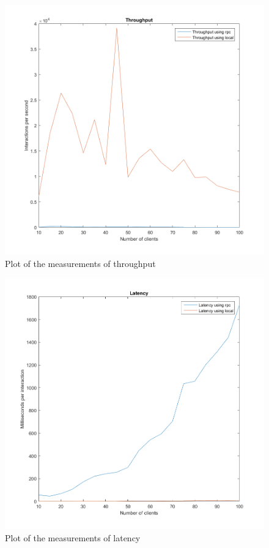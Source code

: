 \documentclass{article}
\theoremstyle{plain}
\theoremstyle{nonumberplain}
\begin{document}
{\centering
\begin{figure}
	\hspace*{-2.2in}
	\includegraphics[scale=0.9]{throughput}
	\caption{Plot of the measurements of throughput}
\end{figure}
\begin{figure}
	\hspace*{-2.2in}
	\includegraphics[scale=0.9]{latency}
	\caption{Plot of the measurements of latency}
\end{figure}}
\end{document}
